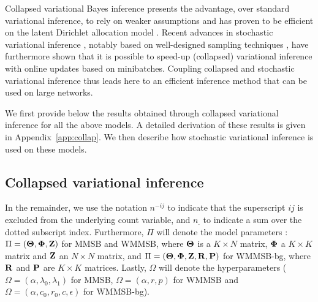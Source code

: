 Collapsed variational Bayes inference presents the advantage, over standard variational inference, to rely on weaker assumptions and has proven to be efficient on the latent Dirichlet allocation model \cite{teh2007collapsed}. Recent advances in stochastic variational inference \cite{hoffman2013stochastic}, notably based on well-designed sampling techniques \cite{gopalan2013efficient,kim2013efficient}, have furthermore shown that it is possible to speed-up (collapsed) variational inference with online updates based on minibatches.
Coupling collapsed and stochastic variational inference thus leads here to an efficient inference method that can be used on large networks.

We first provide below the results obtained through collapsed variational inference for all the above models. A detailed derivation of these results is given in Appendix~\ref{app:collap}. We then describe how stochastic variational inference is used on these models.

\subsection{Collapsed variational inference}

In the remainder, we use the notation $n^{-ij}$ to indicate that the superscript $ij$ is excluded from the underlying count variable, and $n_{\bm{.}}$ to indicate a sum over the dotted subscript index. Furthermore, $\Pi$ will denote the model parameters : $\Pi = (\boldsymbol{\Theta},\boldsymbol{\Phi},\mathbf{Z})$ for MMSB and WMMSB, where $\boldsymbol{\Theta}$ is a $K \times N$ matrix, $\boldsymbol{\Phi}$ a $K \times K$ matrix and $\mathbf{Z}$ an $N \times N$ matrix, and $\Pi = (\boldsymbol{\Theta},\boldsymbol{\Phi},\mathbf{Z},\mathbf{R},\mathbf{P})$ for WMMSB-bg, where $\mathbf{R}$ and $\mathbf{P}$ are $K \times K$ matrices. Lastly, $\Omega$ will denote the hyperparameters ($\Omega = (\alpha,\lambda_0,\lambda_1)$ for MMSB, $\Omega = (\alpha,r,p)$ for WMMSB and $\Omega = (\alpha, c_0, r_0, c, \epsilon)$ for WMMSB-bg).

